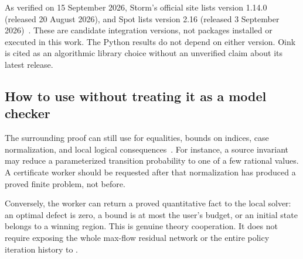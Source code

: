 As verified on 15 September 2026, Storm's official site lists version 1.14.0
(released 20 August 2026), and Spot lists version 2.16 (released 3 September
2026)~\cite{storm,spot}. These are candidate integration versions, not packages
installed or executed in this work. The Python results do not depend on either
version. Oink is cited as an algorithmic library choice without an unverified
claim about its latest release.

\subsection{How to use \grind{} without treating it as a model checker}

The surrounding proof can still use \grind{} for equalities, bounds on indices,
case normalization, and local logical consequences~\cite{grind}. For instance,
a source invariant may reduce a parameterized transition probability to one of
a few rational values. A certificate worker should be requested after that
normalization has produced a proved finite problem, not before.

Conversely, the worker can return a proved quantitative fact to the local
solver: an optimal defect is zero, a bound is at most the user's budget, or an
initial state belongs to a winning region. This is genuine theory cooperation.
It does not require exposing the whole max-flow residual network or the entire
policy iteration history to \grind{}.
